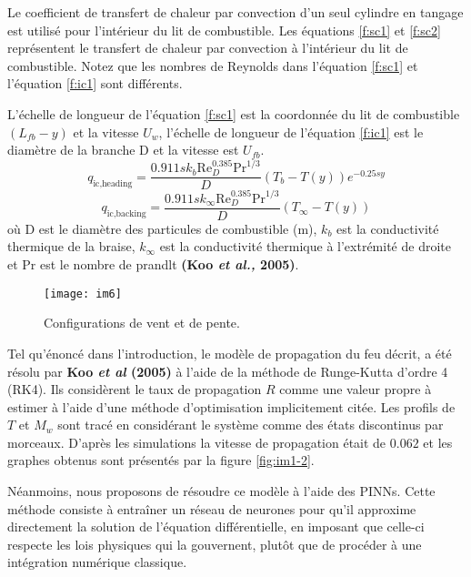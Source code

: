 \documentclass[12pt, oneside]{report} %
\theoremstyle{definition}
\theoremstyle{remark}
\begin{document}
			Le coefficient de transfert de chaleur par convection d'un seul cylindre en tangage est utilisé pour l'intérieur du lit de combustible. Les équations \eqref{f:sc1} et \eqref{f:sc2} représentent le transfert de chaleur par convection à l'intérieur du lit de combustible. Notez que les nombres de Reynolds dans l'équation \eqref{f:sc1} et l'équation \eqref{f:ic1} sont différents. 
			
L'échelle de longueur de l'équation \eqref{f:sc1} est la coordonnée du lit de combustible $(L_{fb} - y)$ et la vitesse $U_w$, l'échelle de longueur de l'équation \eqref{f:ic1} est le diamètre de la branche D et la vitesse est $U_{fb}$. 
\begin{equation}\label{f:ic1}
q_{\text{ic,heading}} = \frac{0.911sk_b \mathrm{Re}_D^{0.385}\mathrm{Pr}^{1/3}}{D}\left(T_b-T(y)\right)e^{-0.25sy}
\end{equation}
\begin{equation}\label{f:ic2}
q_{\text{ic,backing}} = \frac{0.911sk_\infty \mathrm{Re}_D^{0.385}\mathrm{Pr}^{1/3} }{D}\left(T_\infty - T(y)\right)
\end{equation}
où D est le diamètre des particules de combustible (m), $k_b$ est la conductivité thermique de la braise, $k_{\infty}$ est la conductivité thermique à l'extrémité de droite et Pr est le nombre de prandlt \textbf{(Koo \textit{et al., } 2005)}. 
			
					\clearpage
			\begin{landscape}
				\begin{figure}
					\centering
					\texttt{[image: im6]}
					\caption{Configurations de vent et de pente.}
					\label{fig:im6}
				\end{figure}
			\end{landscape}
			\clearpage
							 
	Tel qu'énoncé dans l'introduction, le modèle de propagation du feu décrit, a été résolu par \textbf{Koo \textit{et al} (2005)} à l'aide de la méthode de Runge-Kutta d'ordre 4 (RK4). Ils considèrent le taux de propagation $R$ comme une valeur propre à estimer à l'aide d'une méthode d'optimisation implicitement citée. Les profils de $T$ et $M_w$ sont tracé en considérant le système comme des états discontinus par morceaux. D'après les simulations la vitesse de propagation était de $ 0.062 $ et les graphes obtenus sont présentés par la figure \eqref{fig:im1-2}.
	
Néanmoins, nous proposons de résoudre ce modèle à l’aide des PINNs. Cette méthode consiste à entraîner un réseau de neurones pour qu’il approxime directement la solution de l’équation différentielle, en imposant que celle-ci respecte les lois physiques qui la gouvernent, plutôt que de procéder à une intégration numérique classique.
	
\end{document}
